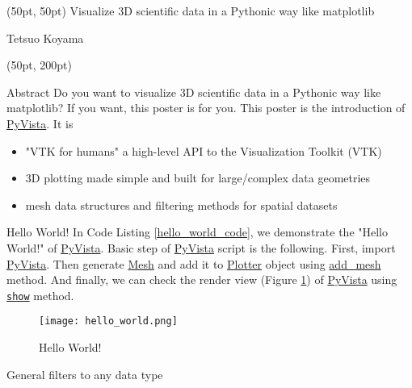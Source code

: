 \documentclass[final]{beamer}
\begin{document}
\begin{frame}[fragile]
\begin{textblock*}{3450pt}(50pt, 50pt)
\Huge Visualize 3D scientific data in a Pythonic way like matplotlib

\Large Tetsuo Koyama
\end{textblock*}

\begin{textblock*}{800pt}(50pt, 200pt)
\begin{block}{Abstract}
Do you want to visualize 3D scientific data in a Pythonic way like matplotlib?
If you want, this poster is for you.
This poster is the introduction of \href{https://pypi.org/project/pyvista/}{PyVista}.
It is
\begin{itemize}
\item "VTK for humans"\: a high-level API to the Visualization Toolkit (VTK)
\item 3D plotting made simple and built for large/complex data geometries
\item mesh data structures and filtering methods for spatial datasets
\end{itemize}

\end{block}
\begin{block}{Hello World!}
In Code Listing \ref{hello_world_code}, we demonstrate the "Hello World!" of \href{https://pypi.org/project/pyvista/}{PyVista}.
Basic step of \href{https://pypi.org/project/pyvista/}{PyVista} script is the following.
First, import \href{https://pypi.org/project/pyvista/}{PyVista}.
Then generate \href{https://docs.pyvista.org/getting-started/what-is-a-mesh.html}{Mesh} and add it to
\href{https://docs.pyvista.org/plotting/plotting.html#pyvista.Plotter}{Plotter} object using \href{https://docs.pyvista.org/plotting/plotting.html#pyvista.BasePlotter.add\_mesh}{add\_mesh} method.
And finally, we can check the render view (Figure \ref{HelloWorldFigure}) of \href{https://pypi.org/project/pyvista/}{PyVista} using \href{https://docs.pyvista.org/plotting/plotting.html#pyvista.Plotter.show}{\texttt{show}} method.


\begin{figure}
\texttt{[image: hello\_world.png]}
\caption{Hello World!}\label{HelloWorldFigure}
\end{figure}
\end{block}
\begin{block}{General filters to any data type}


\end{block}
\end{textblock*}
\end{frame}
\end{document}
